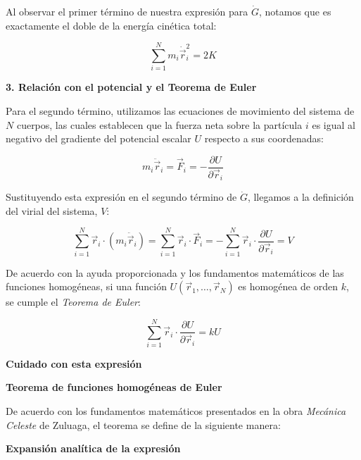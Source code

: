 \documentclass[a4paper]{article}
\begin{document}
Al observar el primer término de nuestra expresión para $\dot{G}$, notamos que es exactamente el doble de la energía cinética total:

$$ \sum_{i=1}^N m_i \dot{\vec{r}}_i^2 = 2K $$

\textbf{3. Relación con el potencial y el Teorema de Euler}

Para el segundo término, utilizamos las ecuaciones de movimiento del sistema de $N$ cuerpos, las cuales establecen que la fuerza neta sobre la partícula $i$ es igual al negativo del gradiente del potencial escalar $U$ respecto a sus coordenadas:

$$ m_i \ddot{\vec{r}}_i = \vec{F}_i = -\frac{\partial U}{\partial \vec{r}_i} $$

Sustituyendo esta expresión en el segundo término de $\dot{G}$, llegamos a la definición del virial del sistema, $V$:

$$ \sum_{i=1}^N \vec{r}_i \cdot (m_i \ddot{\vec{r}}_i) = \sum_{i=1}^N \vec{r}_i \cdot \vec{F}_i = -\sum_{i=1}^N \vec{r}_i \cdot \frac{\partial U}{\partial \vec{r}_i} = V $$

De acuerdo con la ayuda proporcionada y los fundamentos matemáticos de las funciones homogéneas, si una función $U(\vec{r}_1, \dots, \vec{r}_N)$ es homogénea de orden $k$, se cumple el \textit{Teorema de Euler}:

$$ \sum_{i=1}^N \vec{r}_i \cdot \frac{\partial U}{\partial \vec{r}_i} = k U $$

\textbf{Cuidado con esta expresión}

\textbf{Teorema de funciones homogéneas de Euler}

De acuerdo con los fundamentos matemáticos presentados en la obra \textit{Mecánica Celeste} de Zuluaga, el teorema se define de la siguiente manera:

\begin{center}
\end{center}

\textbf{Expansión analítica de la expresión}
\end{document}
